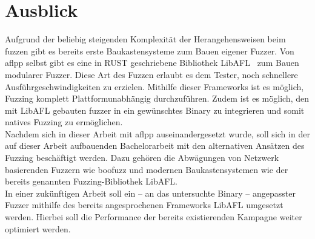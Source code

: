 \clearpage
\section{Ausblick}\label{sec:ausblick}
Aufgrund der beliebig steigenden Komplexität der Herangehensweisen beim fuzzen gibt es bereits erste Baukastensysteme zum Bauen
eigener Fuzzer.
Von \gls{aflpp} selbst gibt es eine in RUST geschriebene Bibliothek LibAFL~\cite{libafl} zum Bauen modularer Fuzzer.
Diese Art des Fuzzen erlaubt es dem Tester, noch schnellere Ausführgeschwindigkeiten zu erzielen.
Mithilfe dieser Frameworks ist es möglich, Fuzzing komplett Plattformunabhängig durchzuführen.
Zudem ist es möglich, den mit LibAFL gebauten fuzzer in ein gewünschtes Binary zu integrieren und somit natives Fuzzing
zu ermöglichen.\\
Nachdem sich in dieser Arbeit mit \gls{aflpp} auseinandergesetzt wurde, soll sich in der auf dieser Arbeit aufbauenden
Bachelorarbeit mit den alternativen Ansätzen des Fuzzing beschäftigt werden.
Dazu gehören die Abwägungen von Netzwerk basierenden Fuzzern wie boofuzz und modernen Baukastensystemen wie der bereits genannten
Fuzzing-Bibliothek LibAFL\@. \\
\linebreak
In einer zukünftigen Arbeit soll ein -- an das untersuchte Binary -- angepasster Fuzzer mithilfe des bereits angesprochenen
Frameworks LibAFL umgesetzt werden.
Hierbei soll die Performance der bereits existierenden Kampagne weiter optimiert werden.